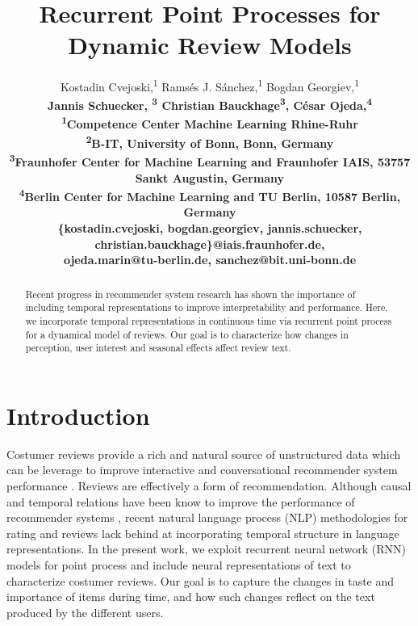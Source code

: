 \documentclass[letterpaper]{article} %
\title{Recurrent Point Processes for Dynamic Review Models}
\author{Kostadin Cvejoski,\textsuperscript{\rm1}
Rams\'es J. S\'anchez,\textsuperscript{\rm1}
 Bogdan Georgiev,\textsuperscript{\rm1}\\
 \bf \Large Jannis Schuecker, \textsuperscript{\rm3}
 \bf \Large Christian Bauckhage\textsuperscript{\rm3},
 C\'esar Ojeda,\textsuperscript{\rm4}\\
 \textsuperscript{1}Competence Center Machine Learning Rhine-Ruhr\\
 \textsuperscript{2}B-IT, University of Bonn, Bonn, Germany\\
 \textsuperscript{3}Fraunhofer Center for Machine Learning and Fraunhofer IAIS, 53757 Sankt
 Augustin, Germany\\
 \textsuperscript{4}Berlin Center for Machine Learning and TU Berlin, 10587 Berlin, Germany\\
 \{kostadin.cvejoski, bogdan.georgiev, jannis.schuecker, christian.bauckhage\}@iais.fraunhofer.de,\\ojeda.marin@tu-berlin.de, sanchez@bit.uni-bonn.de
 }
\newcommand{\+}[1]{\boldsymbol{\mathbf{#1}}}
\begin{document}
\maketitle

\begin{abstract}
Recent progress in recommender system research has shown the importance of including temporal representations to improve interpretability and performance. Here, we incorporate temporal representations in continuous time via recurrent point process for a dynamical model of reviews. Our goal is to characterize how changes in perception, user interest and seasonal effects affect review text.
\end{abstract}

\section{Introduction}
Costumer reviews provide a rich and natural source of unstructured data which can be leverage to improve interactive and conversational recommender system performance \cite{liu2019daml}. Reviews are effectively a form of recommendation. Although causal and temporal relations have been know to improve the performance of recommender systems \cite{wu2017recurrent}, recent natural language process (NLP) methodologies for rating and reviews \cite{zheng2017joint} lack behind at incorporating temporal structure in language representations. In the present work, we exploit recurrent neural network (RNN) models for point process and include neural representations of text to characterize costumer reviews. Our goal is to capture the changes in taste and importance of items during time, and how such changes reflect on the text produced by the different users.
\end{document}

